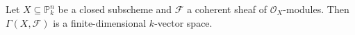 Let $X \subseteq \mathbb{P}_k^n$ be a closed subscheme and $\mathcal{F}$ a
coherent sheaf of $\mathcal{O}_X$-modules. Then $\Gamma(X, \mathcal{F})$ is a
finite-dimensional $k$-vector space.
